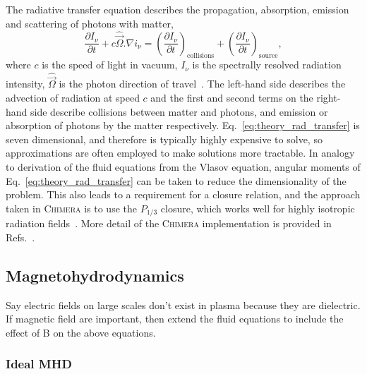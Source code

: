 The radiative transfer equation describes the propagation, absorption, emission and scattering of photons with matter,
\begin{equation}
    \label{eq:theory_rad_transfer}
    \frac{\partial I_\nu}{\partial t} + c \hat{\vec{\Omega}}.\nabla i_\nu = \left ( \frac{\partial I_\nu}{\partial t} \right )_{\text{collisions}} + \left ( \frac{\partial I_\nu}{\partial t} \right )_{\text{source}},
\end{equation}
where $c$ is the speed of light in vacuum, $I_\nu$ is the spectrally resolved radiation intensity, $\hat{\vec{\Omega}}$ is the photon direction of travel~\cite{castor_radiation_2004}.
The left-hand side describes the advection of radiation at speed $c$ and the first and second terms on the right-hand side describe collisions between matter and photons, and emission or absorption of photons by the matter respectively.
Eq.~\ref{eq:theory_rad_transfer} is seven dimensional, and therefore is typically highly expensive to solve, so approximations are often employed to make solutions more tractable.
In analogy to derivation of the fluid equations from the Vlasov equation, angular moments of Eq.~\ref{eq:theory_rad_transfer} can be taken to reduce the dimensionality of the problem.
This also leads to a requirement for a closure relation, and the approach taken in \textsc{Chimera} is to use the $P_{1/3}$ closure, which works well for highly isotropic radiation fields~\cite{morel_diffusionlimit_2000}.
More detail of the \textsc{Chimera} implementation is provided in Refs.~\cite{jennings_radiation_2005,mcglinchey_radiationhydrodynamics_2017}.

\subsection{Magnetohydrodynamics}%
\label{sec:theory_MHD}

Say electric fields on large scales don't exist in plasma because they are dielectric.
If magnetic field are important, then extend the fluid equations to include the effect of B on the above equations.

\subsubsection{Ideal MHD}%
\label{sec:theory_idealMHD}

